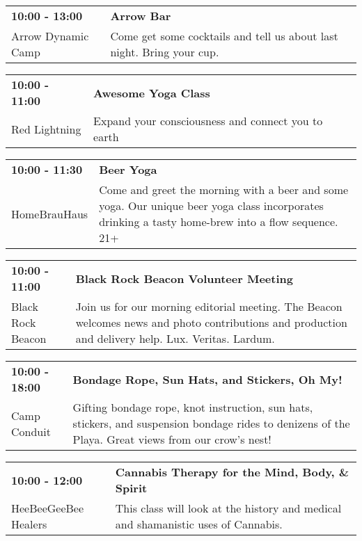 \begin{tabular}{ p{1in} p{2.2in} }
    \textbf{10:00 - 13:00} & \textbf{Arrow Bar} \\
    Arrow Dynamic Camp \newline  & Come get some cocktails and tell us about last night. Bring your cup. \\
    \hline 
\end{tabular}
    
\begin{tabular}{ p{1in} p{2.2in} }
    \textbf{10:00 - 11:00} & \textbf{Awesome Yoga Class} \\
    Red Lightning \newline  & Expand your consciousness and connect you to earth \\
    \hline 
\end{tabular}
    
\begin{tabular}{ p{1in} p{2.2in} }
    \textbf{10:00 - 11:30} & \textbf{Beer Yoga} \\
    HomeBrauHaus \newline  & Come and greet the morning with a beer and some yoga. Our unique beer yoga class incorporates drinking a tasty home-brew into a flow sequence. 21+ \\
    \hline 
\end{tabular}
    
\begin{tabular}{ p{1in} p{2.2in} }
    \textbf{10:00 - 11:00} & \textbf{Black Rock Beacon Volunteer Meeting} \\
    Black Rock Beacon \newline  & Join us for our morning editorial meeting. The Beacon welcomes news and photo contributions and production and delivery help. Lux. Veritas. Lardum. \\
    \hline 
\end{tabular}
    
\begin{tabular}{ p{1in} p{2.2in} }
    \textbf{10:00 - 18:00} & \textbf{Bondage Rope, Sun Hats, and Stickers, Oh My!} \\
    Camp Conduit \newline  & Gifting bondage rope, knot instruction, sun hats, stickers, and suspension bondage rides to denizens of the Playa. Great views from our crow's nest! \\
    \hline 
\end{tabular}
    
\begin{tabular}{ p{1in} p{2.2in} }
    \textbf{10:00 - 12:00} & \textbf{Cannabis Therapy for the Mind, Body, \& Spirit} \\
    HeeBeeGeeBee Healers \newline  & This class will look at the history and medical and shamanistic uses of Cannabis. \\
    \hline 
\end{tabular}
    
